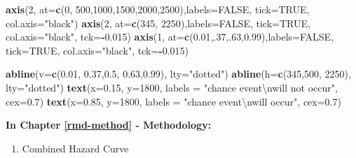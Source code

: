 \documentclass[12pt,twoside]{reedthesis}
\newenvironment{Shaded}{\begin{snugshade}}{\end{snugshade}}
\newcommand{\CharTok}[1]{\textcolor[rgb]{0.31,0.60,0.02}{#1}}
\newcommand{\DataTypeTok}[1]{\textcolor[rgb]{0.13,0.29,0.53}{#1}}
\newcommand{\DecValTok}[1]{\textcolor[rgb]{0.00,0.00,0.81}{#1}}
\newcommand{\FloatTok}[1]{\textcolor[rgb]{0.00,0.00,0.81}{#1}}
\newcommand{\KeywordTok}[1]{\textcolor[rgb]{0.13,0.29,0.53}{\textbf{#1}}}
\newcommand{\NormalTok}[1]{#1}
\newcommand{\OperatorTok}[1]{\textcolor[rgb]{0.81,0.36,0.00}{\textbf{#1}}}
\newcommand{\OtherTok}[1]{\textcolor[rgb]{0.56,0.35,0.01}{#1}}
\newcommand{\StringTok}[1]{\textcolor[rgb]{0.31,0.60,0.02}{#1}}
\providecommand{\tightlist}{%
  \setlength{\itemsep}{0pt}\setlength{\parskip}{0pt}}
\begin{document}
\begin{Shaded}
\begin{Highlighting}[]
\KeywordTok{axis}\NormalTok{(}\DecValTok{2}\NormalTok{, }\DataTypeTok{at=}\KeywordTok{c}\NormalTok{(}\DecValTok{0}\NormalTok{, }\DecValTok{500}\NormalTok{,}\DecValTok{1000}\NormalTok{,}\DecValTok{1500}\NormalTok{,}\DecValTok{2000}\NormalTok{,}\DecValTok{2500}\NormalTok{),}\DataTypeTok{labels=}\OtherTok{FALSE}\NormalTok{, }\DataTypeTok{tick=}\OtherTok{TRUE}\NormalTok{, }\DataTypeTok{col.axis=}\StringTok{"black"}\NormalTok{)}
\KeywordTok{axis}\NormalTok{(}\DecValTok{2}\NormalTok{, }\DataTypeTok{at=}\KeywordTok{c}\NormalTok{(}\DecValTok{345}\NormalTok{, }\DecValTok{2250}\NormalTok{),}\DataTypeTok{labels=}\OtherTok{FALSE}\NormalTok{, }\DataTypeTok{tick=}\OtherTok{TRUE}\NormalTok{, }\DataTypeTok{col.axis=}\StringTok{"black"}\NormalTok{, }\DataTypeTok{tck=}\OperatorTok{-}\FloatTok{0.015}\NormalTok{)}
\KeywordTok{axis}\NormalTok{(}\DecValTok{1}\NormalTok{, }\DataTypeTok{at=}\KeywordTok{c}\NormalTok{(}\FloatTok{0.01}\NormalTok{,.}\DecValTok{37}\NormalTok{,.}\DecValTok{63}\NormalTok{,}\FloatTok{0.99}\NormalTok{),}\DataTypeTok{labels=}\OtherTok{FALSE}\NormalTok{, }\DataTypeTok{tick=}\OtherTok{TRUE}\NormalTok{, }\DataTypeTok{col.axis=}\StringTok{"black"}\NormalTok{, }\DataTypeTok{tck=}\OperatorTok{-}\FloatTok{0.015}\NormalTok{)}

\KeywordTok{abline}\NormalTok{(}\DataTypeTok{v=}\KeywordTok{c}\NormalTok{(}\FloatTok{0.01}\NormalTok{, }\FloatTok{0.37}\NormalTok{,}\FloatTok{0.5}\NormalTok{, }\FloatTok{0.63}\NormalTok{,}\FloatTok{0.99}\NormalTok{), }\DataTypeTok{lty=}\StringTok{"dotted"}\NormalTok{)}
\KeywordTok{abline}\NormalTok{(}\DataTypeTok{h=}\KeywordTok{c}\NormalTok{(}\DecValTok{345}\NormalTok{,}\DecValTok{500}\NormalTok{, }\DecValTok{2250}\NormalTok{), }\DataTypeTok{lty=}\StringTok{"dotted"}\NormalTok{)}
\KeywordTok{text}\NormalTok{(}\DataTypeTok{x=}\FloatTok{0.15}\NormalTok{,  }\DataTypeTok{y=}\DecValTok{1800}\NormalTok{, }\DataTypeTok{labels =} \StringTok{"chance event}\CharTok{\textbackslash{}n}\StringTok{will not occur"}\NormalTok{, }\DataTypeTok{cex=}\FloatTok{0.7}\NormalTok{)}
\KeywordTok{text}\NormalTok{(}\DataTypeTok{x=}\FloatTok{0.85}\NormalTok{,  }\DataTypeTok{y=}\DecValTok{1800}\NormalTok{, }\DataTypeTok{labels =} \StringTok{"chance event}\CharTok{\textbackslash{}n}\StringTok{will occur"}\NormalTok{, }\DataTypeTok{cex=}\FloatTok{0.7}\NormalTok{)}
\end{Highlighting}
\end{Shaded}
\normalsize

\textbf{In Chapter \ref{rmd-method} - Methodology:}
\begin{enumerate}
\def\labelenumi{\arabic{enumi}.}
\tightlist
\item
  Combined Hazard Curve
\end{enumerate}
\tiny
\end{document}
